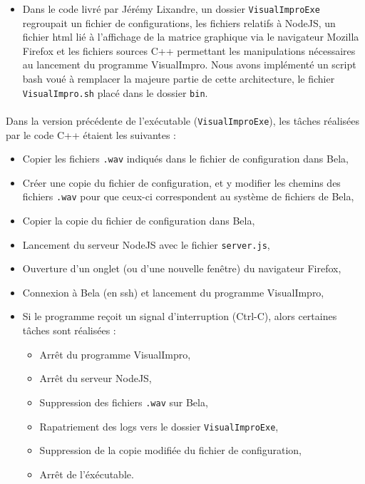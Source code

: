 \begin{itemize}
 \item Dans le code livré par Jérémy Lixandre, un dossier
       \verb!VisualImproExe! regroupait un fichier de
       configurations, les fichiers relatifs à NodeJS, un fichier
       html lié à l'affichage de la matrice graphique via le
       navigateur Mozilla Firefox et les fichiers sources C++
       permettant les manipulations nécessaires au lancement du
       programme VisualImpro. Nous avons implémenté un script
       bash voué à remplacer la majeure partie de cette
       architecture, le fichier \verb!VisualImpro.sh! placé dans
       le dossier \verb!bin!.
\end{itemize}
\paragraph{}
Dans la version précédente de l'exécutable (\verb!VisualImproExe!),
les tâches réalisées par le code C++ étaient les suivantes :
\begin{itemize}
 \item Copier les fichiers \verb!.wav! indiqués dans le fichier de
       configuration dans Bela,
 \item Créer une copie du fichier de configuration, et y modifier les
       chemins des fichiers \verb!.wav! pour que ceux-ci correspondent au
       système de fichiers de Bela,
 \item Copier la copie du fichier de configuration dans Bela,
 \item Lancement du serveur NodeJS avec le fichier \verb!server.js!,
 \item Ouverture d'un onglet (ou d'une nouvelle fenêtre) du
       navigateur Firefox,
 \item Connexion à Bela (en ssh) et lancement du programme
       VisualImpro,
 \item Si le programme reçoit un signal d'interruption (Ctrl-C),
       alors certaines tâches sont réalisées :
       \begin{itemize}
        \item Arrêt du programme VisualImpro,
        \item Arrêt du serveur NodeJS,
        \item Suppression des fichiers \verb!.wav! sur Bela,
        \item Rapatriement des logs vers le dossier \verb!VisualImproExe!,
        \item Suppression de la copie modifiée du fichier de configuration,
        \item Arrêt de l'éxécutable.
       \end{itemize}
\end{itemize}
